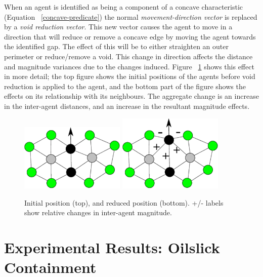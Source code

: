 \documentclass[letterpaper]{article}
\begin{document}
When an agent is identified as being a component of a concave characteristic (Equation ~\ref{concave-predicate}) the normal \textit{movement-direction vector} is replaced by a \textit{void reduction vector}. This new vector causes the agent to move in a direction that will reduce or remove a concave edge by moving the agent towards the identified gap. The effect of this will be to either straighten an outer perimeter or reduce/remove a void. This change in direction affects the distance and magnitude variances due to the changes induced. Figure ~\ref{fig:InterAgentEffect}  shows this effect in more detail; the top figure shows the initial positions of the agents before void reduction is applied to the agent, and the bottom part of the figure shows the effects on its relationship with its neighbours. The aggregate change is an increase in the inter-agent distances, and an increase in the resultant magnitude effects.

\begin{figure}
\begin{center}
\includegraphics[width=5cm]{figures/InterAgentEffect1}
\includegraphics[width=5cm]{figures/InterAgentEffect2}
\end{center}
\caption{Initial position (top), and reduced position (bottom). +/- labels show relative changes in inter-agent magnitude. \label{fig:InterAgentEffect}}
\end{figure}


\section{Experimental Results: Oilslick Containment}
\label{voids:ObjectSurrounding}
\end{document}
